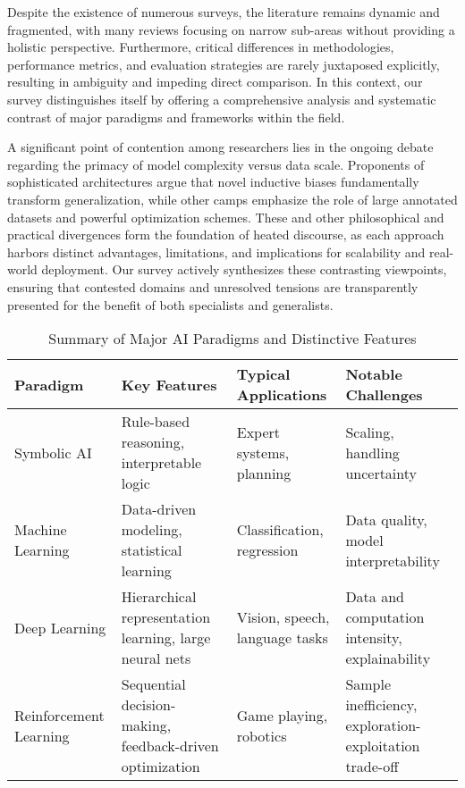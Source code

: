 \documentclass[sigconf]{acmart}
\begin{document}
Despite the existence of numerous surveys, the literature remains dynamic and fragmented, with many reviews focusing on narrow sub-areas without providing a holistic perspective. Furthermore, critical differences in methodologies, performance metrics, and evaluation strategies are rarely juxtaposed explicitly, resulting in ambiguity and impeding direct comparison. In this context, our survey distinguishes itself by offering a comprehensive analysis and systematic contrast of major paradigms and frameworks within the field.

A significant point of contention among researchers lies in the ongoing debate regarding the primacy of model complexity versus data scale. Proponents of sophisticated architectures argue that novel inductive biases fundamentally transform generalization, while other camps emphasize the role of large annotated datasets and powerful optimization schemes. These and other philosophical and practical divergences form the foundation of heated discourse, as each approach harbors distinct advantages, limitations, and implications for scalability and real-world deployment. Our survey actively synthesizes these contrasting viewpoints, ensuring that contested domains and unresolved tensions are transparently presented for the benefit of both specialists and generalists.

\begin{table*}[htbp]
\centering
\caption{Summary of Major AI Paradigms and Distinctive Features}
\label{tab:paradigm-comparison}
\begin{adjustbox}{max width=\textwidth}
\begin{tabular}{@{}llll@{}}
\toprule
Paradigm & Key Features & Typical Applications & Notable Challenges \\
\midrule
Symbolic AI      & Rule-based reasoning, interpretable logic & Expert systems, planning  & Scaling, handling uncertainty \\
Machine Learning & Data-driven modeling, statistical learning & Classification, regression & Data quality, model interpretability \\
Deep Learning    & Hierarchical representation learning, large neural nets & Vision, speech, language tasks & Data and computation intensity, explainability \\
Reinforcement Learning & Sequential decision-making, feedback-driven optimization & Game playing, robotics & Sample inefficiency, exploration-exploitation trade-off \\
\bottomrule
\end{tabular}
\end{adjustbox}
\end{table*}
\end{document}
